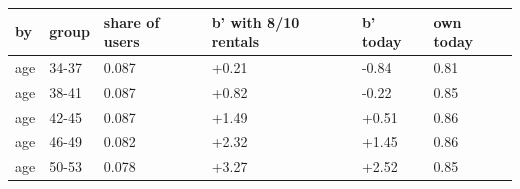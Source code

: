 \begingroup\small
\setlength{\tabcolsep}{3pt}
\renewcommand{\arraystretch}{1.04}
\begin{tabularx}{\linewidth}{XXXXXX}
\toprule
by & group & share of users & b' with 8/10 rentals & b' today & own today \\
\midrule
age & 34-37 & 0.087 & +0.21 & -0.84 & 0.81 \\
age & 38-41 & 0.087 & +0.82 & -0.22 & 0.85 \\
age & 42-45 & 0.087 & +1.49 & +0.51 & 0.86 \\
age & 46-49 & 0.082 & +2.32 & +1.45 & 0.86 \\
age & 50-53 & 0.078 & +3.27 & +2.52 & 0.85 \\
\bottomrule
\end{tabularx}
\endgroup

